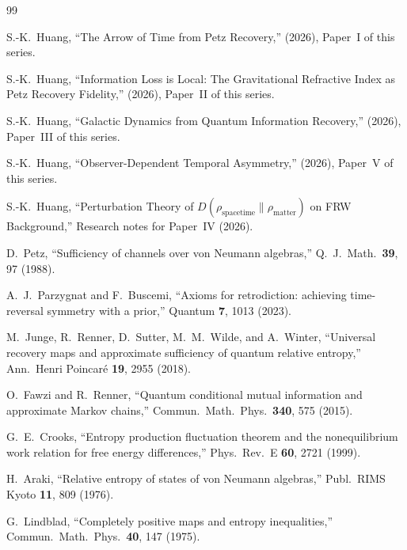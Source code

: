 \documentclass[prd,twocolumn,superscriptaddress,longbibliography,floatfix]{revtex4-2}
\begin{document}
\begin{thebibliography}{99}

S.-K.~Huang,
``The Arrow of Time from Petz Recovery,''
(2026), Paper~I of this series.

S.-K.~Huang,
``Information Loss is Local: The Gravitational Refractive
Index as Petz Recovery Fidelity,''
(2026), Paper~II of this series.

S.-K.~Huang,
``Galactic Dynamics from Quantum Information Recovery,''
(2026), Paper~III of this series.

S.-K.~Huang,
``Observer-Dependent Temporal Asymmetry,''
(2026), Paper~V of this series.

S.-K.~Huang,
``Perturbation Theory of $D(\rho_{\mathrm{spacetime}}
\|\rho_{\mathrm{matter}})$ on FRW Background,''
Research notes for Paper~IV (2026).

D.~Petz,
``Sufficiency of channels over von Neumann algebras,''
Q.~J.\ Math.\ \textbf{39}, 97 (1988).

A.~J.~Parzygnat and F.~Buscemi,
``Axioms for retrodiction: achieving time-reversal
symmetry with a prior,''
Quantum \textbf{7}, 1013 (2023).

M.~Junge, R.~Renner, D.~Sutter, M.~M.~Wilde, and
A.~Winter,
``Universal recovery maps and approximate sufficiency
of quantum relative entropy,''
Ann.\ Henri Poincar\'{e} \textbf{19}, 2955 (2018).

O.~Fawzi and R.~Renner,
``Quantum conditional mutual information and
approximate Markov chains,''
Commun.\ Math.\ Phys.\ \textbf{340}, 575 (2015).

G.~E.~Crooks,
``Entropy production fluctuation theorem and the
nonequilibrium work relation for free energy
differences,''
Phys.\ Rev.\ E \textbf{60}, 2721 (1999).

H.~Araki,
``Relative entropy of states of von Neumann algebras,''
Publ.\ RIMS Kyoto \textbf{11}, 809 (1976).

G.~Lindblad,
``Completely positive maps and entropy inequalities,''
Commun.\ Math.\ Phys.\ \textbf{40}, 147 (1975).


\end{thebibliography}
\end{document}
